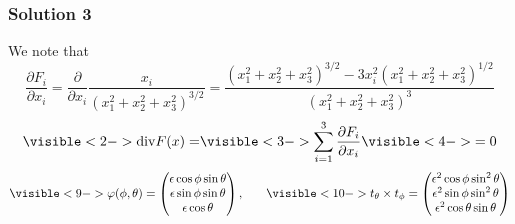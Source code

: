 \documentclass[10pt, t, allowdisplaybreaks]{beamer}
\begin{document}
\begin{frame}
    \frametitle{Solution 3}
    \par We note that 
    \begin{equation*}
        \frac{\partial F_i}{\partial x_i} = \frac{\partial }{\partial x_i}\frac{x_i}{(x_1^2+x_2^2+x_3^2)^{3/2}} = \frac{(x_1^2+x_2^2+x_3^2)^{3/2} - 3x_i^2(x_1^2+x_2^2+x_3^2)^{1/2}}{(x_1^2+x_2^2+x_3^2)^{3}}
    \end{equation*}
    \begin{equation*}
        \visible<2->{
            \text{div}F(x) =
        }
        \visible<3->{
            \sum^3_{i = 1}\frac{\partial F_i}{\partial x_i}
        }
        \visible<4->{
            =0
        }         
    \end{equation*}
    \begin{equation*}
        \visible<9->{
            \varphi(\phi, \theta) = \begin{pmatrix}
                \epsilon \cos \phi \sin \theta\\
                \epsilon \sin\phi \sin\theta\\
                \epsilon\cos\theta
            \end{pmatrix},
        }
        \qquad
        \visible<10->{
            t_\theta\times t_\phi = \begin{pmatrix}
                \epsilon^2\cos\phi\sin^2\theta\\
                \epsilon^2\sin\phi\sin^2\theta\\
                \epsilon^2\cos\theta\sin\theta
            \end{pmatrix}
        }        
    \end{equation*}
\end{frame}
\end{document}
